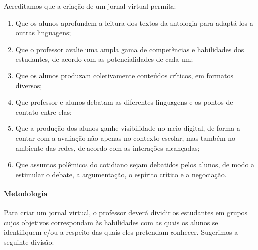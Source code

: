 \documentclass{extarticle}
\begin{document}
Acreditamos que a criação de um jornal virtual permita: 

\begin{enumerate}
\item Que os alunos
aprofundem a leitura dos textos da antologia para adaptá-los a outras
linguagens; 

\item Que o professor avalie uma ampla gama de competências e
habilidades dos estudantes, de acordo com as potencialidades de cada um;


\item Que os alunos produzam coletivamente conteúdos críticos, em formatos
diversos; 

\item Que professor e alunos debatam as diferentes linguagens e
os pontos de contato entre elas; 

\item Que a produção dos alunos ganhe
visibilidade no meio digital, de forma a contar com a avaliação não
apenas no contexto escolar, mas também no ambiente das redes, de acordo
com as interações alcançadas; 

\item Que assuntos polêmicos do cotidiano
sejam debatidos pelos alunos, de modo a estimular o debate, a
argumentação, o espírito crítico e a negociação.
\end{enumerate}

\paragraph{Metodologia}

Para criar um jornal virtual, o professor deverá dividir os estudantes
em grupos cujos objetivos correspondam às habilidades com as quais os
alunos se identifiquem e/ou a respeito das quais eles pretendam
conhecer. Sugerimos a seguinte divisão:
\end{document}
